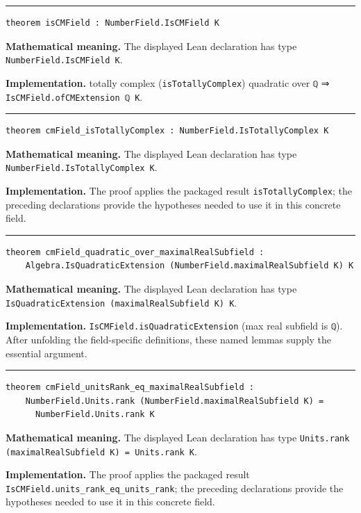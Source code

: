 \documentclass[UTF8,a4paper,11pt,fontset=fandol]{ctexart}
\theoremstyle{definition}
\newcommand{\statementsep}{\par\medskip\hrule\medskip}
\begin{document}
\statementsep
\begin{verbatim}
theorem isCMField : NumberField.IsCMField K
\end{verbatim}
\noindent\textbf{Mathematical meaning.} The displayed Lean declaration has type \texttt{NumberField.\allowbreak{}IsCMField K}.\par
\noindent\textbf{Implementation.} totally complex (\texttt{isTotallyComplex}) quadratic over \texttt{ℚ} ⇒ \texttt{IsCMField.\allowbreak{}ofCMExtension ℚ K}.\par
\statementsep
\begin{verbatim}
theorem cmField_isTotallyComplex : NumberField.IsTotallyComplex K
\end{verbatim}
\noindent\textbf{Mathematical meaning.} The displayed Lean declaration has type \texttt{NumberField.\allowbreak{}IsTotallyComplex K}.\par
\noindent\textbf{Implementation.} The proof applies the packaged result \texttt{isTotallyComplex}; the preceding declarations provide the hypotheses needed to use it in this concrete field.\par
\statementsep
\begin{verbatim}
theorem cmField_quadratic_over_maximalRealSubfield :
    Algebra.IsQuadraticExtension (NumberField.maximalRealSubfield K) K
\end{verbatim}
\noindent\textbf{Mathematical meaning.} The displayed Lean declaration has type \texttt{IsQuadraticExtension (maximalRealSubfield K) K}.\par
\noindent\textbf{Implementation.} \texttt{IsCMField.\allowbreak{}isQuadraticExtension} (max real subfield is \texttt{ℚ}). After unfolding the field-specific definitions, these named lemmas supply the essential argument.\par
\statementsep
\begin{verbatim}
theorem cmField_unitsRank_eq_maximalRealSubfield :
    NumberField.Units.rank (NumberField.maximalRealSubfield K) =
      NumberField.Units.rank K
\end{verbatim}
\noindent\textbf{Mathematical meaning.} The displayed Lean declaration has type \texttt{Units.\allowbreak{}rank (maximalRealSubfield K) = Units.\allowbreak{}rank K}.\par
\noindent\textbf{Implementation.} The proof applies the packaged result \texttt{IsCMField.\allowbreak{}units\_\allowbreak{}rank\_\allowbreak{}eq\_\allowbreak{}units\_\allowbreak{}rank}; the preceding declarations provide the hypotheses needed to use it in this concrete field.\par
\end{document}
